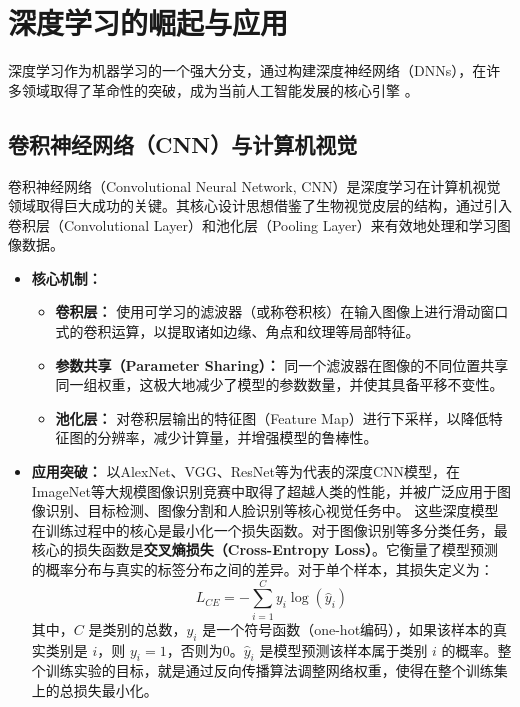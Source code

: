 \section{深度学习的崛起与应用}
\label{sec:dl_rise}
深度学习作为机器学习的一个强大分支，通过构建深度神经网络（DNNs），在许多领域取得了革命性的突破，成为当前人工智能发展的核心引擎 \cite{ahmed2023deep}。

\subsection{卷积神经网络（CNN）与计算机视觉}
\label{ssec:cnn_cv}
卷积神经网络（Convolutional Neural Network, CNN）是深度学习在计算机视觉领域取得巨大成功的关键。其核心设计思想借鉴了生物视觉皮层的结构，通过引入卷积层（Convolutional Layer）和池化层（Pooling Layer）来有效地处理和学习图像数据。
\begin{itemize}
    \item \textbf{核心机制：}
        \begin{itemize}
            \item \textbf{卷积层：} 使用可学习的滤波器（或称卷积核）在输入图像上进行滑动窗口式的卷积运算，以提取诸如边缘、角点和纹理等局部特征。
            \item \textbf{参数共享（Parameter Sharing）：} 同一个滤波器在图像的不同位置共享同一组权重，这极大地减少了模型的参数数量，并使其具备平移不变性。
            \item \textbf{池化层：} 对卷积层输出的特征图（Feature Map）进行下采样，以降低特征图的分辨率，减少计算量，并增强模型的鲁棒性。
        \end{itemize}
    \item \textbf{应用突破：} 以AlexNet、VGG、ResNet等为代表的深度CNN模型，在ImageNet等大规模图像识别竞赛中取得了超越人类的性能，并被广泛应用于图像识别、目标检测、图像分割和人脸识别等核心视觉任务中。
    这些深度模型在训练过程中的核心是最小化一个损失函数。对于图像识别等多分类任务，最核心的损失函数是\textbf{交叉熵损失（Cross-Entropy Loss）}。它衡量了模型预测的概率分布与真实的标签分布之间的差异。对于单个样本，其损失定义为：
	\[
		L_{CE} = - \sum_{i=1}^{C} y_i \log(\hat{y}_i)
	\]
	其中，$C$ 是类别的总数，$y_i$ 是一个符号函数（one-hot编码），如果该样本的真实类别是 $i$，则 $y_i=1$，否则为0。$\hat{y}_i$ 是模型预测该样本属于类别 $i$ 的概率。整个训练实验的目标，就是通过反向传播算法调整网络权重，使得在整个训练集上的总损失最小化。
\end{itemize}

